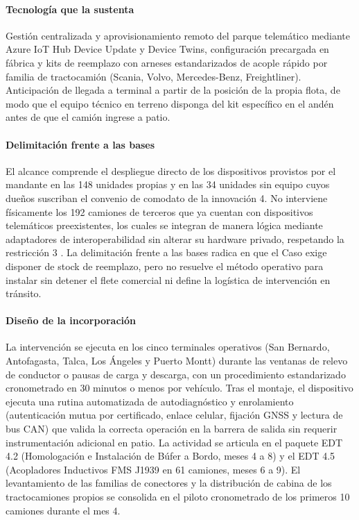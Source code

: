 \paragraph{Tecnología que la sustenta} Gestión centralizada y aprovisionamiento remoto del parque
telemático mediante Azure IoT Hub Device Update y Device Twins, configuración precargada en fábrica y
kits de reemplazo con arneses estandarizados de acople rápido por familia de tractocamión (Scania,
Volvo, Mercedes-Benz, Freightliner). Anticipación de llegada a terminal a partir de la posición de la
propia flota, de modo que el equipo técnico en terreno disponga del kit específico en el andén antes de
que el camión ingrese a patio.

\paragraph{Delimitación frente a las bases} El alcance comprende el despliegue directo de los
dispositivos provistos por el mandante en las 148 unidades propias y en las 34 unidades sin equipo
cuyos dueños suscriban el convenio de comodato de la innovación 4. No interviene físicamente los 192
camiones de terceros que ya cuentan con dispositivos telemáticos preexistentes, los cuales se integran
de manera lógica mediante adaptadores de interoperabilidad sin alterar su hardware privado, respetando la restricción 3 . La
delimitación frente a las bases radica en que el Caso exige disponer de stock de reemplazo, pero no
resuelve el método operativo para instalar sin detener el flete comercial ni define la logística de
intervención en tránsito.

\paragraph{Diseño de la incorporación} La intervención se ejecuta en los cinco terminales operativos
(San Bernardo, Antofagasta, Talca, Los Ángeles y Puerto Montt) durante las ventanas de relevo de
conductor o pausas de carga y descarga, con un procedimiento estandarizado cronometrado en 30 minutos o
menos por vehículo. Tras el montaje, el dispositivo ejecuta una rutina automatizada de autodiagnóstico
y enrolamiento (autenticación mutua por certificado, enlace celular, fijación GNSS y lectura de bus CAN) que valida la
correcta operación en la barrera de salida sin requerir instrumentación adicional en patio. La
actividad se articula en el paquete EDT 4.2 (Homologación e Instalación de Búfer a Bordo, meses 4 a 8)
y el EDT 4.5 (Acopladores Inductivos FMS J1939 en 61 camiones, meses 6 a 9). El levantamiento de las
familias de conectores y la distribución de cabina de los tractocamiones propios se consolida en el
piloto cronometrado de los primeros 10 camiones durante el mes 4.

